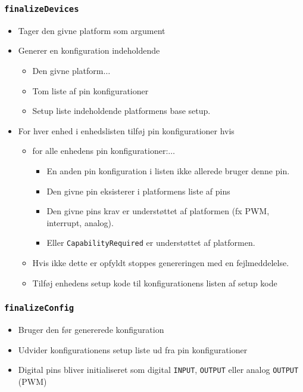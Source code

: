\documentclass[t]{beamer}
\begin{document}
\begin{frame}
  \frametitle{\texttt{finalizeDevices}}

  \begin{itemize}
  \item Tager den givne platform som argument

  \item Generer en konfiguration indeholdende 
      \begin{itemize}
      \item {} {Den givne platform}{$\ldots$}
      \item<only@2> Tom liste af pin konfigurationer 
      \item<only@2> Setup liste indeholdende platformens base setup.
      \end{itemize}
  \item For hver enhed i enhedslisten tilføj pin konfigurationer hvis
    \begin{itemize}
    \item {} {for alle enhedens pin konfigurationer:}{$\ldots$}
      \begin{itemize}[<only@3>]
      \item En anden pin konfiguration i listen ikke allerede bruger denne
        pin.

      \item Den givne pin eksisterer i platformens liste af pins

      \item Den givne pins krav er understøttet af platformen (fx PWM,
        interrupt, analog).

      \item Eller \texttt{CapabilityRequired} er understøttet af platformen.
      \end{itemize}
      
    \item<only@3> Hvis ikke dette er opfyldt stoppes genereringen med en
      fejlmeddelelse.

    \item<only@3> Tilføj enhedens setup kode til konfigurationens listen af
      setup kode
    \end{itemize}
  \end{itemize}

\end{frame}

\begin{frame}
  \frametitle{\texttt{finalizeConfig}}
  
  \begin{itemize}
  \item Bruger den før genererede konfiguration

  \item Udvider konfigurationens setup liste ud fra pin konfigurationer

  \item Digital pins bliver initialiseret som digital \texttt{INPUT},
    \texttt{OUTPUT} eller analog \texttt{OUTPUT} (PWM)
  \end{itemize}

\end{frame}
\end{document}
